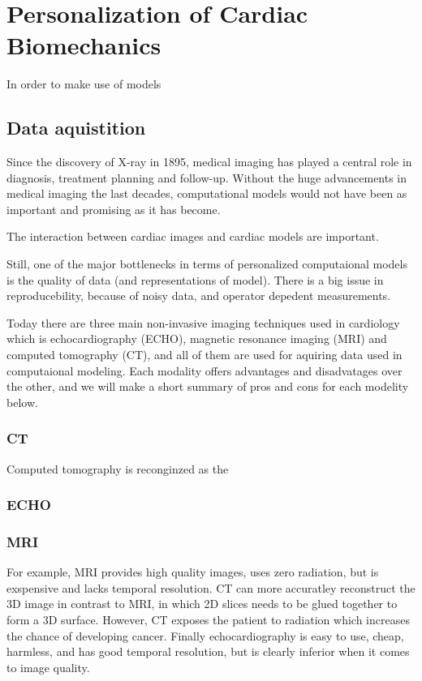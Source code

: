 \section{Personalization of Cardiac Biomechanics}


In order to make use of models 


\subsection{Data aquistition}

Since the discovery of X-ray in 1895, medical imaging has played a central
role in diagnosis, treatment planning and follow-up. Without the huge
advancements in medical imaging the last decades, computational models
would not have been as important and promising as it has become.

The interaction between cardiac images and cardiac models are important.


Still, one of the major bottlenecks in terms of personalized
computaional models is the quality of data (and representations of
model). There is a big issue in
reproducebility, because of noisy data, and operator depedent
measurements.

Today there are three main non-invasive imaging techniques used in
cardiology which is echocardiography (ECHO), magnetic
resonance imaging (MRI) and computed tomography (CT), and all of them
are used for aquiring data used in computaional modeling. Each
modality offers advantages and disadvatages over the other, and we
will make a short summary of pros and cons for each modelity below.

\subsubsection{CT}
Computed tomography is reconginzed as the 

\subsubsection{ECHO}

\subsubsection{MRI}






For example, MRI provides
high quality images, uses zero radiation, but is exspensive and lacks
temporal resolution. CT can more accuratley reconstruct the 3D image
in contrast to MRI, in which 2D slices needs to be glued together to
form a 3D surface. However, CT exposes the patient to radiation which
increases the chance of developing cancer. Finally echocardiography is
easy to use, cheap, harmless, and  has good temporal resolution, but
is clearly inferior when it comes to image quality.

